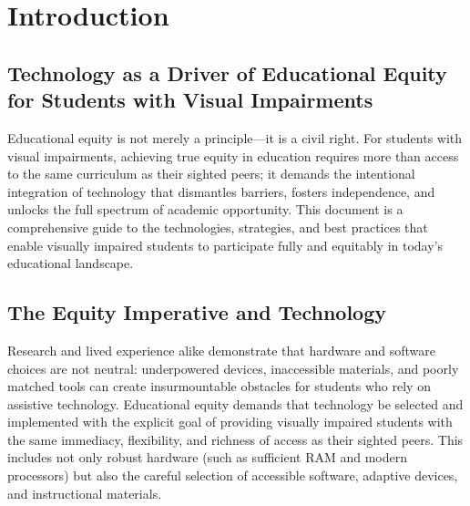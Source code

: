 \chapter{Introduction}\label{ch:introduction}

\section{Technology as a Driver of Educational Equity for Students with Visual Impairments}
\label{sec:intro-tech-equity}

Educational equity is not merely a principle—it is a civil right.\supercite{ADA1990, IDEA2004} For students with visual impairments, achieving true equity in education requires more than access to the same curriculum as their sighted peers; it demands the intentional integration of technology that dismantles barriers, fosters independence, and unlocks the full spectrum of academic opportunity.\supercite{Kelly2011, Day2021} This document is a comprehensive guide to the technologies, strategies, and best practices that enable visually impaired students to participate fully and equitably in today’s educational landscape.

\section{The Equity Imperative and Technology}
\label{sec:intro-equity-imperative}

Research and lived experience alike demonstrate that hardware and software choices are not neutral: underpowered devices, inaccessible materials, and poorly matched tools can create insurmountable obstacles for students who rely on assistive technology.\supercite{EducationalEquityReport2024, Smith2022, UserExperienceImprovements} Educational equity demands that technology be selected and implemented with the explicit goal of providing visually impaired students with the same immediacy, flexibility, and richness of access as their sighted peers.\supercite{Fowler2011ScreenReaderLatency, Sears1993TheEffectOfResponseTime, ScreenreaderLagImpact} This includes not only robust hardware (such as sufficient RAM and modern processors) but also the careful selection of accessible software, adaptive devices, and instructional materials.\supercite{Burgstahler2015, ModernProcessorBenefits, SoftwareMemoryDemands}

